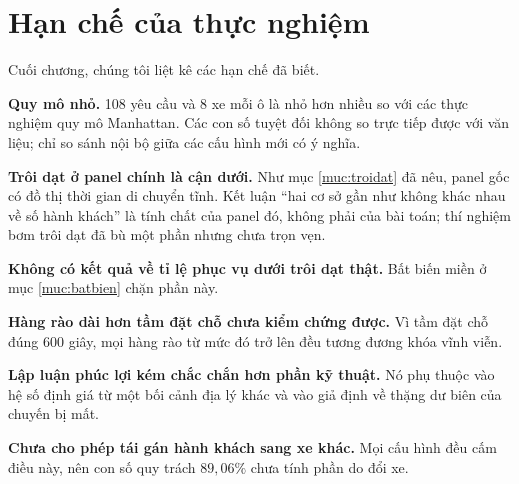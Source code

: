 \section{Hạn chế của thực nghiệm}
\label{muc:hanche}

Cuối chương, chúng tôi liệt kê các hạn chế đã biết.

\textbf{Quy mô nhỏ.} 108 yêu cầu và 8 xe mỗi ô là nhỏ hơn nhiều so với các thực nghiệm quy mô
Manhattan. Các con số tuyệt đối không so trực tiếp được với văn liệu; chỉ so sánh nội bộ giữa
các cấu hình mới có ý nghĩa.

\textbf{Trôi dạt ở panel chính là cận dưới.} Như mục \ref{muc:troidat} đã nêu, panel gốc có đồ thị thời gian
di chuyển tĩnh. Kết luận ``hai cơ sở gần như không khác nhau về số hành khách'' là tính chất của
panel đó, không phải của bài toán; thí nghiệm bơm trôi dạt đã bù một phần nhưng chưa trọn vẹn.

\textbf{Không có kết quả về tỉ lệ phục vụ dưới trôi dạt thật.} Bất biến miền ở mục \ref{muc:batbien} chặn phần
này.

\textbf{Hàng rào dài hơn tầm đặt chỗ chưa kiểm chứng được.} Vì tầm đặt chỗ đúng 600 giây, mọi
hàng rào từ mức đó trở lên đều tương đương khóa vĩnh viễn.

\textbf{Lập luận phúc lợi kém chắc chắn hơn phần kỹ thuật.} Nó phụ thuộc vào hệ số định giá từ
một bối cảnh địa lý khác và vào giả định về thặng dư biên của chuyến bị mất.

\textbf{Chưa cho phép tái gán hành khách sang xe khác.} Mọi cấu hình đều cấm điều này, nên con
số quy trách $89{,}06\%$ chưa tính phần do đổi xe.
